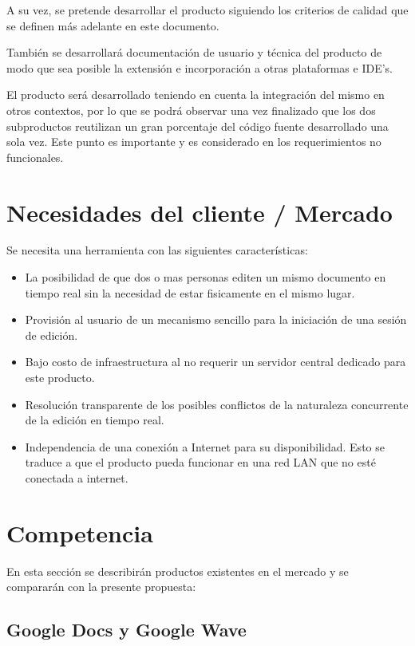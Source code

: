 \documentclass[12pt,a4paper]{article}
\begin{document}
A su vez, se pretende desarrollar el producto siguiendo los criterios de calidad que se definen más adelante en este documento.

También se desarrollará documentación de usuario y técnica del producto de modo que sea posible la extensión e incorporación a otras plataformas e IDE's.

El producto será desarrollado teniendo en cuenta la integración del mismo en otros contextos, por lo que se podrá observar una vez finalizado que los dos subproductos reutilizan un gran porcentaje del código fuente desarrollado una sola vez. Este punto es importante y es considerado en los requerimientos no funcionales.	
	
	\section{Necesidades del cliente / Mercado}
	
	Se necesita una herramienta con las siguientes características:
	\begin{itemize}
		\item La posibilidad de que dos o mas personas editen un mismo documento en tiempo real sin la necesidad de estar fisicamente en el mismo lugar.
		\item Provisión al usuario de un mecanismo sencillo para la iniciación de una sesión de edición.
		\item Bajo costo de infraestructura al no requerir un servidor central dedicado para este producto.
		\item Resolución transparente de los posibles conflictos de la naturaleza concurrente de la edición en tiempo real.
		\item Independencia de una conexión a Internet para su disponibilidad. Esto se traduce a que el producto pueda funcionar en una red LAN que no esté conectada a internet.
	\end{itemize}

	\section{Competencia}

En esta sección se describirán productos existentes en el mercado y se compararán con la presente propuesta:

	\subsection{Google Docs y Google Wave}
\end{document}
